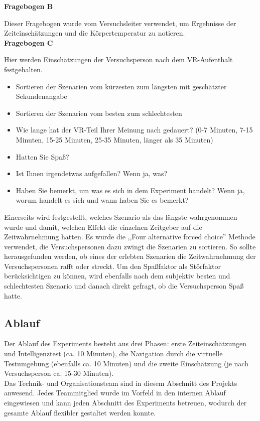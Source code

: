 \documentclass{Bericht}
\begin{document}
\textbf{Fragebogen B}

Dieser Fragebogen wurde vom Versuchsleiter verwendet, um Ergebnisse der Zeiteinschätzungen und die Körpertemperatur zu notieren.\\


\textbf{Fragebogen C}

Hier werden Einschätzungen der Versuchsperson nach dem VR-Aufenthalt festgehalten.

\begin{itemize}
	\setlength{\itemsep}{0em}
	\item Sortieren der Szenarien vom kürzesten zum längsten mit geschätzter Sekundenangabe
	\item Sortieren der Szenarien vom besten zum schlechtesten
	\item Wie lange hat der VR-Teil Ihrer Meinung nach gedauert? (0-7 Minuten, 7-15 Minuten, 15-25 Minuten, 25-35 Minuten, länger als 35 Minuten)
	\item Hatten Sie Spaß?
	\item Ist Ihnen irgendetwas aufgefallen? Wenn ja, was?
	\item Haben Sie bemerkt, um was es sich in dem Experiment handelt? Wenn ja, worum handelt es sich und wann haben Sie es bemerkt?
\end{itemize}

Einerseits wird festgestellt, welches Szenario als das längste wahrgenommen wurde und damit, welchen Effekt die einzelnen Zeitgeber auf die Zeitwahrnehmung hatten. 
Es wurde die ,,Four alternative forced choice'' Methode verwendet, die Versuchspersonen dazu zwingt die Szenarien zu sortieren. So sollte herausgefunden werden, ob eines der erlebten Szenarien die Zeitwahrnehmung der Versuchspersonen rafft oder streckt.	
Um den Spaßfaktor als Störfaktor berücksichtigen zu können, wird ebenfalls nach dem subjektiv besten und schlechtesten Szenario und danach direkt gefragt, ob die Versuchsperson Spaß hatte.
\subsection{Ablauf}

Der Ablauf des Experiments besteht aus drei Phasen: erste Zeiteinschätzungen und Intelligenztest (ca. 10 Minuten), die Navigation durch die virtuelle Testumgebung (ebenfalls ca. 10 Minuten) und die zweite Einschätzung (je nach Versuchsperson ca. 15-30 Minuten).\\
Das Technik- und Organisationsteam sind in diesem Abschnitt des Projekts anwesend. Jedes Teammitglied wurde im Vorfeld in den internen Ablauf eingewiesen und kann jeden Abschnitt des Experiments betreuen, wodurch der gesamte Ablauf flexibler gestaltet werden konnte.\\ 
\end{document}
